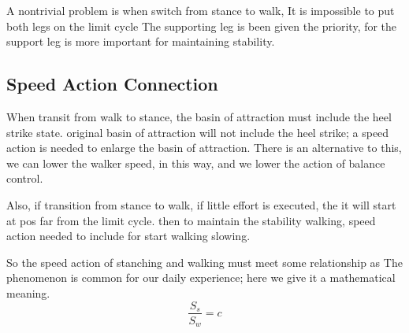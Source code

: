 A nontrivial problem is when switch from stance to walk, 
It is impossible to put both legs on the limit cycle
The supporting leg is been given the priority, for the support leg is more important for maintaining stability.





\subsection{Speed Action Connection}
When transit from walk to stance, the basin of attraction must include the heel strike state.
original basin of attraction will not include the heel strike; a speed action is needed to enlarge the basin of attraction.
There is an alternative to this, we can lower the walker speed, in this way, and we lower the action of balance control.

Also, if transition from stance to walk, if little effort is executed, the it will start at pos far from the limit cycle.
then to maintain the stability walking, speed action needed to include for start walking slowing.

So the speed action of stanching and walking must meet some relationship as
The phenomenon is common for our daily experience; here we give it a mathematical meaning.
\[
\frac{S_s}{S_w}=c
\]

























